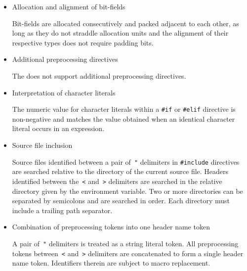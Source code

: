 
\begin{itemize}

\item Allocation and alignment of bit-fields 

Bit-fields are allocated consecutively and packed adjacent to each other, as long as they do not straddle allocation units and the alignment of their respective types does not require padding bits.

\end{itemize}


\begin{itemize}

\item Additional preprocessing directives 

The \ecs{} does not support additional preprocessing directives.

\item Interpretation of character literals 

The numeric value for character literals within a \texttt{\#if} or \texttt{\#elif} directive is non-negative and matches the value obtained when an identical character literal occurs in an expression.

\item Source file inclusion 

Source files identified between a pair of~\texttt{"} delimiters in \texttt{\#include} directives are searched relative to the directory of the current source file.
Headers identified between the~\texttt{<} and~\texttt{>} delimiters are searched in the relative directory given by the  environment variable.
Two or more directories can be separated by semicolons and are searched in order.
Each directory must include a trailing path separator.

\item Combination of preprocessing tokens into one header name token 

A pair of~\texttt{"} delimiters is treated as a string literal token.
All preprocessing tokens between~\texttt{<} and~\texttt{>} delimiters are concatenated to form a single header name token.
Identifiers therein are subject to macro replacement.


\end{itemize}
